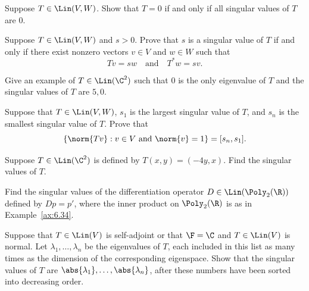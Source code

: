 
\begin{exercise}
Suppose $T\in\Lin(V,W)$. Show that $T=0$ if and only if all singular values of
$T$ are $0$.
\end{exercise}

\begin{exercise}
Suppose $T\in\Lin(V,W)$ and $s>0$. Prove that $s$ is a singular value of $T$ if
and only if there exist nonzero vectors $v\in V$ and $w\in W$ such that
\[ Tv=sw \quad\text{and}\quad T^*w=sv. \]
\end{exercise}

\begin{exercise}
Give an example of $T\in\Lin(\C^2)$ such that $0$ is the only eigenvalue of $T$
and the singular values of $T$ are $5,0$.
\end{exercise}

\begin{exercise}
Suppose that $T\in\Lin(V,W)$, $s_1$ is the largest singular value of $T$, and
$s_n$ is the smallest singular value of $T$. Prove that
\[ \{\norm{Tv} : v\in V \text{ and } \norm{v}=1\} = [s_n,s_1]. \]
\end{exercise}

\begin{exercise}
Suppose $T\in\Lin(\C^2)$ is defined by $T(x,y)=(-4y,x)$. Find the singular
values of $T$.
\end{exercise}

\begin{exercise}
Find the singular values of the differentiation operator
$D\in\Lin(\Poly_2(\R))$ defined by $Dp=p'$, where the inner product on
$\Poly_2(\R)$ is as in Example~\ref{ax:6.34}.
\end{exercise}

\begin{exercise}
Suppose that $T\in\Lin(V)$ is self-adjoint or that $\F=\C$ and $T\in\Lin(V)$ is
normal. Let $\lambda_1,\dots,\lambda_n$ be the eigenvalues of $T$, each
included in this list as many times as the dimension of the corresponding
eigenspace. Show that the singular values of $T$ are
$\abs{\lambda_1},\dots,\abs{\lambda_n}$, after these numbers have been sorted
into decreasing order.
\end{exercise}

